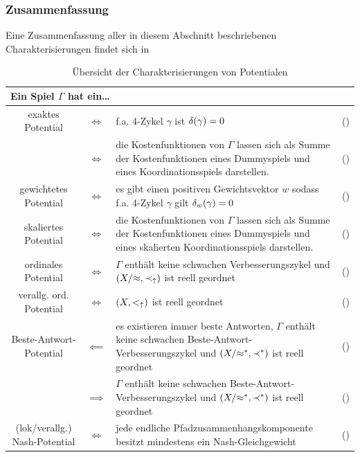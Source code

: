 \subsubsection{Zusammenfassung}

Eine Zusammenfassung aller in diesem Abschnitt beschriebenen Charakterisierungen findet sich in 

\begin{table}\centering\renewcommand*{\arraystretch}{1.2}
	\begin{tabularx}{\textwidth}{ccXr}
		\multicolumn{4}{l}{Ein Spiel $\Gamma$ hat ein\dots} \\\hline\hline
		exaktes Potential 				& $\iff$	& f.a. 4-Zykel $\gamma$ ist $\delta(\gamma)=0$	
		& (\Cref{satz:CharExPot}) 	\\
										& $\iff$	& die Kostenfunktionen von $\Gamma$ lassen sich als Summe der Kostenfunktionen eines Dummyspiels und eines
		Koordinationsspiels darstellen.
		& (\Cref{satz:CharExPotAlt})\\\hline
		gewichtetes Potential			& $\iff$	& es gibt einen positiven Gewichtsvektor $w$ sodass f.a. 4-Zykel $\gamma$ gilt $\delta_w(\gamma)=0$	
		& (\Cref{satz:CharGewPot})	\\\hline
		skaliertes Potential			& $\iff$	& die Kostenfunktionen von $\Gamma$ lassen sich als Summe der Kostenfunktionen eines Dummyspiels und eines skalierten Koordinationsspiels darstellen.
		& (\Cref{satz:CharSkalPot})	\\\hline
		ordinales Potential				& $\iff$	& $\Gamma$ enthält keine schwachen Verbesserungszykel und $(X/{\approx}, \prec_\uparrow)$ ist reell geordnet
		& (\Cref{satz:CharOrdPot})	\\\hline
		verallg. ord. Potential			& $\iff$	& $(X, <_\uparrow)$ ist reell geordnet
		& (\Cref{satz:CharVerallOrdPot})\\\hline
		Beste-Antwort-Potential			& $\impliedby$	& es existieren immer beste Antworten, $\Gamma$ enthält keine schwachen Beste-Antwort-Verbesserungszykel und $(X/{\approx^\ast}, \prec^\ast)$ ist reell geordnet
		& (\Cref{satz:CharExBAPot})	\\
										& $\implies$	& $\Gamma$ enthält keine schwachen Beste-Antwort-Verbesserungszykel und $(X/{\approx^\ast}, \prec^\ast)$ ist reell geordnet
		& (\Cref{satz:CharExBAPot})		\\\hline
		(lok/verallg.) Nash-Potential	& $\iff$	& jede endliche Pfadzusammenhangskomponente besitzt mindestens ein Nash-Gleichgewicht
		& (\Cref{satz:CharExNashPot})
	\end{tabularx}	
	\caption{Übersicht der Charakterisierungen von Potentialen\\}\label{tab:PotCharakterisierung}
\end{table}
